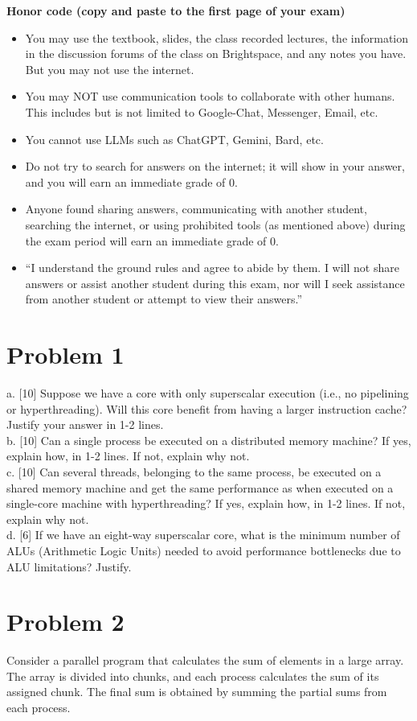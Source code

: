 \documentclass{article}
\begin{document}
\textbf{Honor code (copy and paste to the first page of your exam)}
\begin{itemize}
    \item You may use the textbook, slides, the class recorded lectures, the information in the discussion forums of the class on Brightspace, and any notes you have. But you may not use the internet.
    \item You may NOT use communication tools to collaborate with other humans. This includes but is not limited to Google-Chat, Messenger, Email, etc.
    \item You cannot use LLMs such as ChatGPT, Gemini, Bard, etc.
    \item Do not try to search for answers on the internet; it will show in your answer, and you will earn an immediate grade of 0.
    \item Anyone found sharing answers, communicating with another student, searching the internet, or using prohibited tools (as mentioned above) during the exam period will earn an immediate grade of 0.
    \item ``I understand the ground rules and agree to abide by them. I will not share answers or assist another student during this exam, nor will I seek assistance from another student or attempt to view their answers.''
\end{itemize}


\section*{Problem 1}
a. [10]  Suppose we have a core with only superscalar execution (i.e., no pipelining or hyperthreading). Will this core benefit from having a larger instruction cache? Justify your answer in 1-2 lines. \\
b. [10] Can a single process be executed on a distributed memory machine? If yes, explain how, in 1-2 lines. If not, explain why not. \\
c. [10] Can several threads, belonging to the same process, be executed on a shared memory machine and get the same performance as when executed on a single-core machine with hyperthreading? If yes, explain how, in 1-2 lines. If not, explain why not. \\
d. [6] If we have an eight-way superscalar core, what is the minimum number of ALUs (Arithmetic Logic Units) needed to avoid performance bottlenecks due to ALU limitations? Justify.


\section*{Problem 2}
Consider a parallel program that calculates the sum of elements in a large array. The array is divided into chunks, and each process calculates the sum of its assigned chunk.  The final sum is obtained by summing the partial sums from each process.
\end{document}
